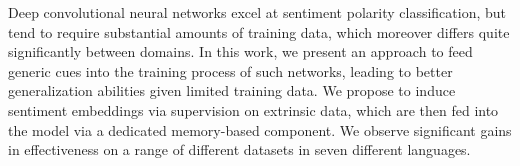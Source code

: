 Deep convolutional neural networks excel at sentiment polarity classification, but tend to require substantial amounts of training data, which moreover differs quite significantly between domains. In this work, we present an approach to feed generic cues into the training process of such networks, leading to better generalization abilities given limited training data. We propose to induce sentiment embeddings via supervision on extrinsic data, which are then fed into the model via a dedicated memory-based component. We observe significant gains in effectiveness on a range of different datasets in seven different languages.
